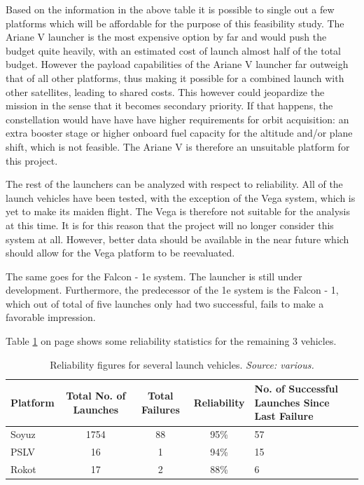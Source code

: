 Based on the information  in the above table it is possible to single out a few platforms which will be affordable for the purpose of this feasibility study. The Ariane V launcher is the most expensive option by far and would push the budget quite heavily, with an estimated cost of launch almost half of the total budget. However the payload capabilities of the Ariane V launcher far outweigh that of all other platforms, thus making it possible for a combined launch with other satellites, leading to shared costs. This however could jeopardize the mission in the sense that it becomes secondary priority. If that happens, the constellation would have have have higher requirements for orbit acquisition: an extra booster stage or higher onboard fuel capacity for the altitude and/or plane shift, which is not feasible. The Ariane V is therefore an unsuitable platform for this project. 

The rest of the launchers can be analyzed with respect to reliability. All of the launch vehicles have been tested, with the exception of the Vega system, which is yet to make its maiden flight. The Vega is therefore not suitable for the analysis at this time. It is for this reason that the project will no longer consider this system at all.  However, better data should be available in the near future which should allow for the Vega platform to be reevaluated.

The same goes for the Falcon - 1e system. The launcher is still under development. Furthermore, the predecessor of the 1e system is the Falcon - 1, which out of total of five launches only had two successful, fails to make a favorable impression. 

Table \ref{table:LVreliability} on page \pageref{table:LVreliability} shows some reliability statistics for the remaining 3 vehicles.

\begin{table}[h]
\begin{centering}
\begin{tabular}{lcccp{5cm}}
\toprule
Platform & Total No. of Launches & Total Failures & Reliability & No. of Successful Launches Since Last Failure  \\
\midrule
Soyuz   & 1754  &  88 & 95\% & 57 \\
PSLV & 16 & 1 & 94\% & 15 \\
Rokot & 17& 2 & 88\% & 6 \\
\bottomrule
\end{tabular}
\caption{Reliability figures for several launch vehicles. \emph{Source: various.} }
\label{table:LVreliability}
\end{centering}
\end{table}

